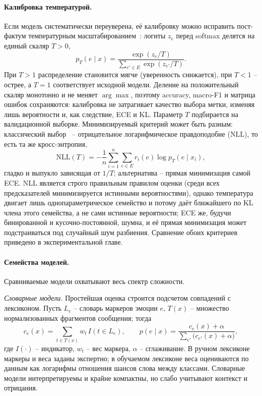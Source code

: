 \documentclass[12pt,a4paper]{report}
\begin{document}
\paragraph{Калибровка температурой.} Если модель систематически переуверена, её калибровку можно исправить пост-фактум температурным масштабированием~\cite{guo2017calibration}: логиты \(z_e\) перед softmax делятся на единый скаляр \(T>0\),
\[
  p_T(e\mid x) = \frac{\exp(z_e/T)}{\sum_{e'\in E}\exp(z_{e'}/T)}.
\]
При \(T>1\) распределение становится мягче (уверенность снижается), при \(T<1\) -- острее, а \(T=1\) соответствует исходной модели. Деление на положительный скаляр монотонно и не меняет \(\arg\max\), поэтому accuracy, macro-F1 и матрица ошибок сохраняются: калибровка не затрагивает качество выбора метки, изменяя лишь вероятности и, как следствие, ECE и KL. Параметр \(T\) подбирается на валидационной выборке. Минимизируемый критерий может быть разным: классический выбор~\cite{guo2017calibration} -- отрицательное логарифмическое правдоподобие (NLL), то есть та же кросс-энтропия,
\[
  \mathrm{NLL}(T) = -\frac{1}{n}\sum_{i=1}^{n}\sum_{e\in E} r_i(e)\log p_T(e\mid x_i),
\]
гладко и выпукло зависящая от \(1/T\); альтернатива -- прямая минимизация самой ECE. NLL является строго правильным правилом оценки (среди всех предсказателей минимизируется истинными вероятностями), однако температура двигает лишь однопараметрическое семейство и потому даёт ближайшего по KL члена этого семейства, а не сами истинные вероятности; ECE же, будучи бинированной и кусочно-постоянной, шумна, и её прямая минимизация может подстраиваться под случайный шум разбиения. Сравнение обоих критериев приведено в экспериментальной главе.

\paragraph{Семейства моделей.} Сравниваемые модели охватывают весь спектр сложности.

\emph{Словарные модели.} Простейшая оценка строится подсчетом совпадений с лексиконом. Пусть \(L_e\) -- словарь маркеров эмоции \(e\), \(T(x)\) -- множество нормализованных фрагментов сообщения; тогда
\[
  c_e(x) = \sum_{t\in T(x)} w_t\, I(t\in L_e), \qquad
  p(e\mid x) = \frac{c_e(x) + \alpha}{\sum_{e'} \big(c_{e'}(x) + \alpha\big)},
\]
где \(I(\cdot)\) -- индикатор, \(w_t\) -- вес маркера, \(\alpha\) -- сглаживание. В ручном лексиконе маркеры и веса заданы экспертно; в обучаемом лексиконе веса оцениваются по данным как логарифмы отношения шансов слова между классами. Словарные модели интерпретируемы и крайне компактны, но слабо учитывают контекст и отрицания.
\end{document}

